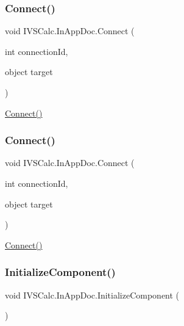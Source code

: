 \subsubsection{\texorpdfstring{Connect()}{Connect()}\hspace{0.1cm}{\footnotesize\ttfamily [4/5]}}
{\footnotesize\ttfamily void I\+V\+S\+Calc.\+In\+App\+Doc.\+Connect (\begin{DoxyParamCaption}\item[{int}]{connection\+Id,  }\item[{object}]{target }\end{DoxyParamCaption})}



\hyperlink{class_i_v_s_calc_1_1_in_app_doc_a470427a176a8d7a0de6c0b82a9a45c4b}{Connect()} 

\mbox{\label{class_i_v_s_calc_1_1_in_app_doc_a470427a176a8d7a0de6c0b82a9a45c4b}} 
\subsubsection{\texorpdfstring{Connect()}{Connect()}\hspace{0.1cm}{\footnotesize\ttfamily [5/5]}}
{\footnotesize\ttfamily void I\+V\+S\+Calc.\+In\+App\+Doc.\+Connect (\begin{DoxyParamCaption}\item[{int}]{connection\+Id,  }\item[{object}]{target }\end{DoxyParamCaption})}



\hyperlink{class_i_v_s_calc_1_1_in_app_doc_a470427a176a8d7a0de6c0b82a9a45c4b}{Connect()} 

\mbox{\label{class_i_v_s_calc_1_1_in_app_doc_aaea69e2cf03d01b3fcd38f048dbeb569}} 
\subsubsection{\texorpdfstring{Initialize\+Component()}{InitializeComponent()}\hspace{0.1cm}{\footnotesize\ttfamily [1/5]}}
{\footnotesize\ttfamily void I\+V\+S\+Calc.\+In\+App\+Doc.\+Initialize\+Component (\begin{DoxyParamCaption}{ }\end{DoxyParamCaption})}



